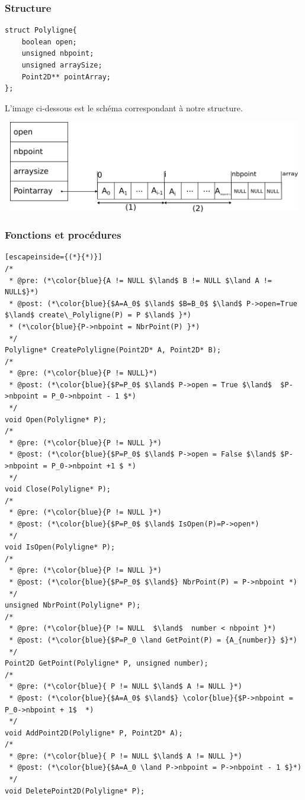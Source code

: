 \documentclass[a4paper, 11pt, oneside]{article}
\begin{document}
\subsubsection{Structure}

\begin{lstlisting}
struct Polyligne{
	boolean open;
	unsigned nbpoint;
	unsigned arraySize;
	Point2D** pointArray;
};
\end{lstlisting}

L'image ci-dessous est le schéma correspondant à notre structure.

\includegraphics[height=4cm, width=14cm]{tab1.png}

\subsubsection{Fonctions et procédures}

\begin{lstlisting}[escapeinside={(*}{*)}]
/* 
 * @pre: (*\color{blue}{A != NULL $\land$ B != NULL $\land A != NULL$}*)
 * @post: (*\color{blue}{$A=A_0$ $\land$ $B=B_0$ $\land$ P->open=True $\land$ create\_Polyligne(P) = P $\land$ }*)
 * (*\color{blue}{P->nbpoint = NbrPoint(P) }*)
 */
Polyligne* CreatePolyligne(Point2D* A, Point2D* B);
/* 
 * @pre: (*\color{blue}{P != NULL}*)
 * @post: (*\color{blue}{$P=P_0$ $\land$ P->open = True $\land$  $P->nbpoint = P_0->nbpoint - 1 $*)
 */
void Open(Polyligne* P);
/* 
 * @pre: (*\color{blue}{P != NULL }*)
 * @post: (*\color{blue}{$P=P_0$ $\land$ P->open = False $\land$ $P->nbpoint = P_0->nbpoint +1 $ *)
 */
void Close(Polyligne* P);
/* 
 * @pre: (*\color{blue}{P != NULL }*)
 * @post: (*\color{blue}{$P=P_0$ $\land$ IsOpen(P)=P->open*)
 */
void IsOpen(Polyligne* P);
/* 
 * @pre: (*\color{blue}{P != NULL }*)
 * @post: (*\color{blue}{$P=P_0$ $\land$} NbrPoint(P) = P->nbpoint *)
 */
unsigned NbrPoint(Polyligne* P);
/* 
 * @pre: (*\color{blue}{P != NULL  $\land$  number < nbpoint }*)
 * @post: (*\color{blue}{$P=P_0 \land GetPoint(P) = {A_{number}} $}*)
 */
Point2D GetPoint(Polyligne* P, unsigned number);
/*
 * @pre: (*\color{blue}{ P != NULL $\land$ A != NULL }*)
 * @post: (*\color{blue}{$A=A_0$ $\land$} \color{blue}{$P->nbpoint = P_0->nbpoint + 1$  *)
 */
void AddPoint2D(Polyligne* P, Point2D* A);
/*
 * @pre: (*\color{blue}{ P != NULL $\land$ A != NULL }*)
 * @post: (*\color{blue}{$A=A_0 \land P->nbpoint = P->nbpoint - 1 $}*)
 */
void DeletePoint2D(Polyligne* P);
\end{lstlisting}
\end{document}
